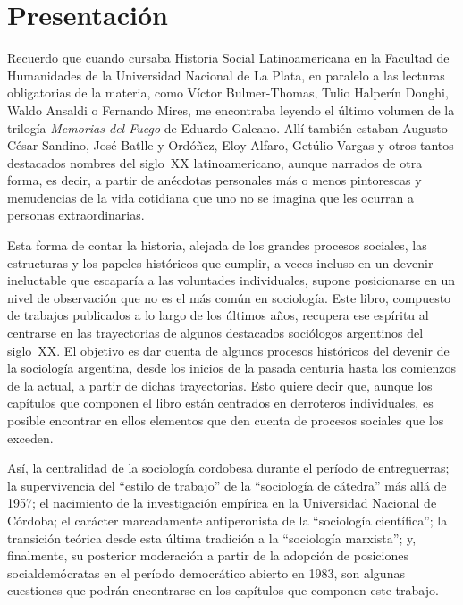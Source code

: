 
\frontmatter



\tableofcontents

\chapter{Presentación}

Recuerdo que cuando cursaba Historia Social Latinoamericana en la Facultad de Humanidades de la Universidad Nacional de La Plata, en paralelo a las lecturas obligatorias de la materia, como Víctor Bulmer-Thomas, Tulio Halperín Donghi, Waldo Ansaldi o Fernando Mires, me encontraba leyendo el último volumen de la trilogía \emph{Memorias del Fuego} de Eduardo Galeano. Allí también estaban Augusto César Sandino, José Batlle y Ordóñez, Eloy Alfaro, Getúlio Vargas y otros tantos destacados nombres del siglo~XX latinoamericano, aunque narrados de otra forma, es decir, a partir de anécdotas personales más o menos pintorescas y menudencias de la vida cotidiana que uno no se imagina que les ocurran a personas extraordinarias.

Esta forma de contar la historia, alejada de los grandes procesos sociales, las estructuras y los papeles históricos que cumplir, a veces incluso en un devenir ineluctable que escaparía a las voluntades individuales, supone posicionarse en un nivel de observación que no es el más común en sociología. Este libro, compuesto de trabajos publicados a lo largo de los últimos años, recupera ese espíritu al centrarse en las trayectorias de algunos destacados sociólogos argentinos del siglo~XX. El objetivo es dar cuenta de algunos procesos históricos del devenir de la sociología argentina, desde los inicios de la pasada centuria hasta los comienzos de la actual, a partir de dichas trayectorias. Esto quiere decir que, aunque los capítulos que componen el libro están centrados en derroteros individuales, es posible encontrar en ellos elementos que den cuenta de procesos sociales que los exceden.

Así, la centralidad de la sociología cordobesa durante el período de entreguerras; la supervivencia del \enquote{estilo de trabajo} de la \enquote{sociología de cátedra} más allá de 1957; el nacimiento de la investigación empírica en la Universidad Nacional de Córdoba; el carácter marcadamente antiperonista de la \enquote{sociología científica}; la transición teórica desde esta última tradición a la \enquote{sociología marxista}; y, finalmente, su posterior moderación a partir de la adopción de posiciones socialdemócratas en el período democrático abierto en 1983, son algunas cuestiones que podrán encontrarse en los capítulos que componen este trabajo.

